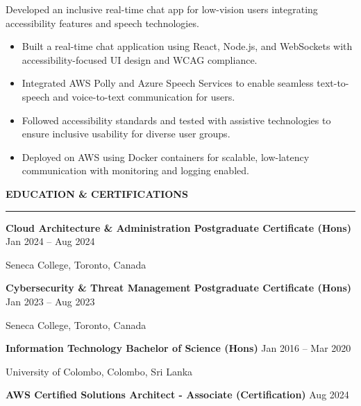 \documentclass[10pt,letterpaper]{article}
\begin{document}
\vspace{-1pt}

Developed an inclusive real-time chat app for low-vision users integrating accessibility features and speech technologies.
\vspace{-1pt}
\begin{itemize}
\item Built a real-time chat application using React, Node.js, and WebSockets with accessibility-focused UI design and WCAG compliance.
\item Integrated AWS Polly and Azure Speech Services to enable seamless text-to-speech and voice-to-text communication for users.
\item Followed accessibility standards and tested with assistive technologies to ensure inclusive usability for diverse user groups.
\item Deployed on AWS using Docker containers for scalable, low-latency communication with monitoring and logging enabled.
\end{itemize}

\vspace{6pt}

\textbf{EDUCATION \& CERTIFICATIONS}\\[-8pt]
\noindent\rule{\textwidth}{1pt}

\vspace{-2pt}

\textbf{Cloud Architecture \& Administration Postgraduate Certificate (Hons)} \hfill Jan 2024 -- Aug 2024

Seneca College, Toronto, Canada

\textbf{Cybersecurity \& Threat Management Postgraduate Certificate (Hons)} \hfill Jan 2023 -- Aug 2023

Seneca College, Toronto, Canada

\textbf{Information Technology Bachelor of Science (Hons)} \hfill Jan 2016 -- Mar 2020

University of Colombo, Colombo, Sri Lanka

\textbf{AWS Certified Solutions Architect - Associate (Certification)} \hfill Aug 2024
\end{document}

